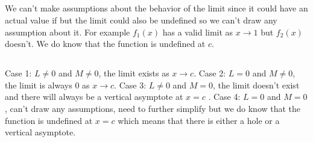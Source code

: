 \documentclass{article}
\begin{document}
\subsection{}
We can't make assumptions about the behavior of the limit since it could have an actual value if but the limit could also be undefined so we can't draw any assumption about it. For example \(f_1(x)\) has a valid limit as \(x \to 1\) but \(f_2(x)\) doesn't. We do know that the function is undefined at \(c\). 
\subsection{}
Case 1: \(L \neq 0\) and \(M \neq 0\), the limit exists as \(x \to c\). Case 2: \(L = 0\) and \(M \neq 0\), the limit is always \(0\) as \(x \to c\). Case 3: \(L \neq 0\) and \(M = 0\), the limit doesn't exist and there will always be a vertical asymptote at \(x=c\) . Case 4: \(L = 0\) and \(M = 0\), can't draw any assumptions, need to further simplify but we do know that the function is undefined at \(x=c\) which means that there is either a hole or a vertical asymptote. 
\end{document}
